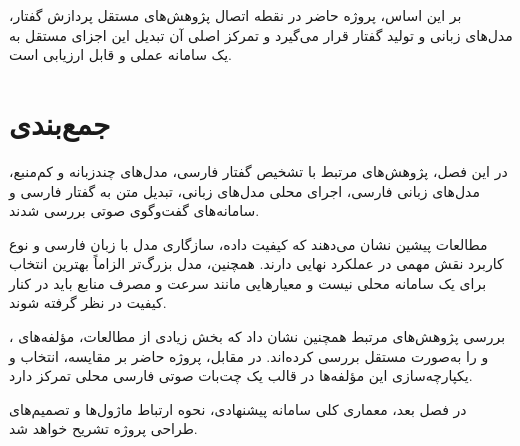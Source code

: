بر این اساس، پروژه حاضر در نقطه اتصال پژوهش‌های مستقل
پردازش گفتار، مدل‌های زبانی و تولید گفتار قرار می‌گیرد و
تمرکز اصلی آن تبدیل این اجزای مستقل به یک سامانه عملی و
قابل ارزیابی است.
\section{جمع‌بندی}

در این فصل، پژوهش‌های مرتبط با تشخیص گفتار فارسی،
مدل‌های چندزبانه و کم‌منبع، مدل‌های زبانی فارسی،
اجرای محلی مدل‌های زبانی، تبدیل متن به گفتار فارسی
و سامانه‌های گفت‌وگوی صوتی بررسی شدند.

مطالعات پیشین نشان می‌دهند که کیفیت داده، سازگاری مدل با
زبان فارسی و نوع کاربرد نقش مهمی در عملکرد نهایی دارند.
همچنین، مدل بزرگ‌تر الزاماً بهترین انتخاب برای یک سامانه
محلی نیست و معیارهایی مانند سرعت و مصرف منابع باید در کنار
کیفیت در نظر گرفته شوند.

بررسی پژوهش‌های مرتبط همچنین نشان داد که بخش زیادی از
مطالعات، مؤلفه‌های ،  و  را به‌صورت مستقل بررسی
کرده‌اند.
در مقابل، پروژه حاضر بر مقایسه، انتخاب و یکپارچه‌سازی این
مؤلفه‌ها در قالب یک چت‌بات صوتی فارسی محلی تمرکز دارد.

در فصل بعد، معماری کلی سامانه پیشنهادی، نحوه ارتباط ماژول‌ها
و تصمیم‌های طراحی پروژه تشریح خواهد شد.
